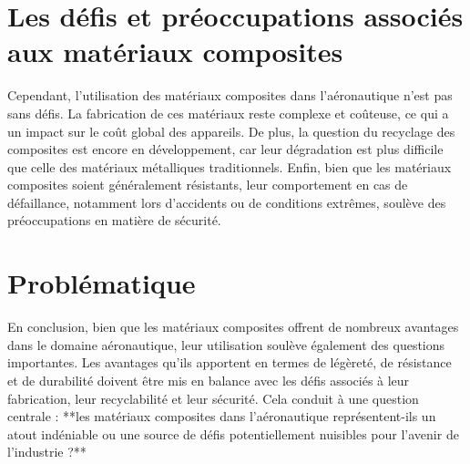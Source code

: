 \section{Les défis et préoccupations associés aux matériaux composites}

Cependant, l'utilisation des matériaux composites dans l'aéronautique n'est pas sans défis. La fabrication de ces matériaux reste complexe et coûteuse, ce qui a un impact sur le coût global des appareils. De plus, la question du recyclage des composites est encore en développement, car leur dégradation est plus difficile que celle des matériaux métalliques traditionnels. Enfin, bien que les matériaux composites soient généralement résistants, leur comportement en cas de défaillance, notamment lors d'accidents ou de conditions extrêmes, soulève des préoccupations en matière de sécurité.


\section{Problématique}

En conclusion, bien que les matériaux composites offrent de nombreux avantages dans le domaine aéronautique, leur utilisation soulève également des questions importantes. Les avantages qu'ils apportent en termes de légèreté, de résistance et de durabilité doivent être mis en balance avec les défis associés à leur fabrication, leur recyclabilité et leur sécurité. Cela conduit à une question centrale : **les matériaux composites dans l'aéronautique représentent-ils un atout indéniable ou une source de défis potentiellement nuisibles pour l'avenir de l'industrie ?**










